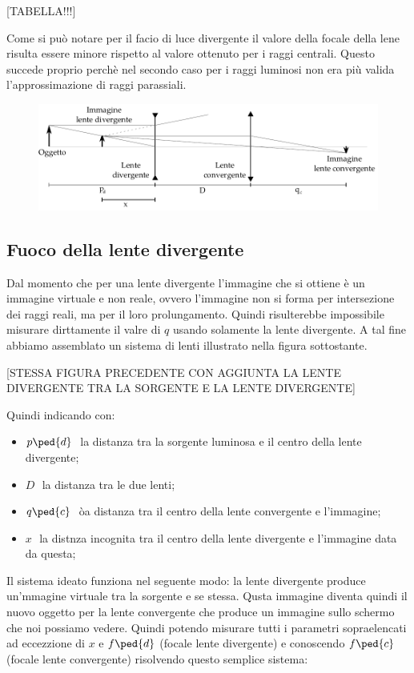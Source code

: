[TABELLA!!!]

Come si può notare per il facio di luce divergente il valore della focale della lene risulta essere minore rispetto al valore ottenuto per i raggi centrali. Questo succede proprio perchè nel secondo caso per i raggi luminosi non era più valida l'approssimazione di raggi parassiali.


\begin{figure}[b!]
	\includegraphics[width=16cm]{drawing2.pdf}
\end{figure}

\subsection{Fuoco della lente divergente}

Dal momento che per una lente divergente l'immagine che si ottiene è un immagine virtuale e non reale, ovvero l'immagine non si forma per intersezione dei raggi reali, ma per il loro prolungamento. Quindi risulterebbe impossibile misurare dirttamente il valre di $q$ usando solamente la lente divergente.
A tal fine abbiamo assemblato un sistema di lenti illustrato nella figura sottostante.

[STESSA FIGURA PRECEDENTE CON AGGIUNTA LA LENTE DIVERGENTE TRA LA SORGENTE E LA LENTE DIVERGENTE]

Quindi indicando con:
\begin{itemize}
	\item{$p\ped{d}\,\,$ la distanza tra la sorgente luminosa e il centro della lente divergente;}
	\item{$D\,\,$ la distanza tra le due lenti;}
	\item{$q\ped{c}\,\,$ òa distanza tra il centro della lente convergente e l'immagine;}
	\item{$x\,\,$ la distnza incognita tra il centro della lente divergente e l'immagine data da questa;}
\end{itemize}
Il sistema ideato funziona nel seguente modo: la lente divergente produce un'mmagine virtuale tra la sorgente e se stessa. Qusta immagine diventa quindi il nuovo oggetto per la lente convergente che produce un immagine sullo schermo che noi possiamo vedere. Quindi potendo misurare tutti i parametri sopraelencati ad eccezzione di $x$ e $f\ped{d}$ (focale lente divergente) e conoscendo $f\ped{c}$ (focale lente convergente) risolvendo questo semplice sistema:

